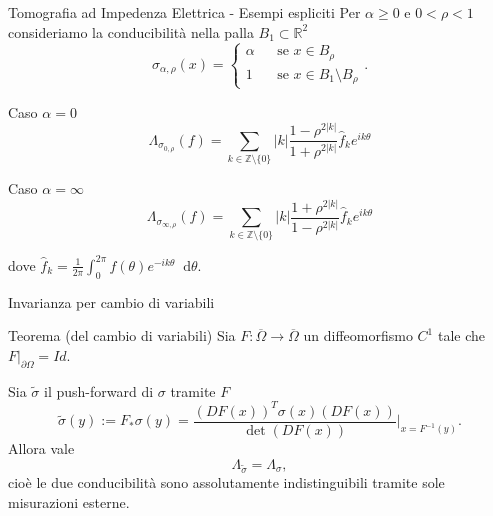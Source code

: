 \documentclass{beamer}
\newcommand{\bbR}{\mathbb{R}}
\newcommand{\de}{\partial}
\newcommand*\diff{\mathop{}\!\mathrm{d}}
\newcommand{\1}{\mathbbm{1}}
\begin{document}
\begin{frame}{Tomografia ad Impedenza Elettrica - Esempi espliciti}
Per $\alpha\geq0$ e $0<\rho<1$ consideriamo la conducibilità nella palla $B_1\subset\bbR^2$
\begin{equation*}
\sigma_{\alpha,\rho}(x) = 
	\left\{\begin{array}{lll}
         \alpha & & \text{se } x\in B_\rho \\
         1 & & \text{se } x\in B_1 \setminus B_\rho
    \end{array}\right..
\end{equation*}
\vspace{-15pt}
\pause
\begin{block}{Caso $\alpha=0$}
\[
\Lambda_{\sigma_{0,\rho}}(f) = 
\sum_{k\in\mathbb{Z}\setminus\{0\}} |k|\frac{1-\rho^{2|k|}}{1+\rho^{2|k|}} \hat{f}_k e^{ik\theta} 
\]
\end{block}
\pause
\begin{block}{Caso $\alpha=\infty$}
\[
\Lambda_{\sigma_{\infty,\rho}}(f) = 
\sum_{k\in\mathbb{Z}\setminus\{0\}} |k|\frac{1+\rho^{2|k|}}{1-\rho^{2|k|}} \hat{f}_k e^{ik\theta}
\]
\end{block}
\pause
dove $\hat{f}_k = \frac{1}{2\pi} \int_0^{2\pi} f(\theta)e^{-ik\theta} \diff\theta.$
\end{frame}


\begin{frame}{Invarianza per cambio di variabili}
\pause
\begin{block}{Teorema (del cambio di variabili)}
Sia $F:\overline{\Omega}\rightarrow\overline{\Omega}$ un diffeomorfismo $C^1$ tale che $F|_{\de\Omega}=Id$.\pause

Sia $\tilde{\sigma}$ il push-forward di $\sigma$ tramite $F$
\[ \tilde{\sigma}(y):=F_*\sigma(y)=\frac{(DF(x))^T\sigma(x)(DF(x))}{\det(DF(x))}\Bigg|_{x=F^{-1}(y)}.
\]\pause
Allora vale
\[ \Lambda_{\tilde{\sigma}} = \Lambda_\sigma ,\]
cioè le due conducibilità sono assolutamente indistinguibili tramite sole misurazioni esterne.
\end{block}
\end{frame}
\end{document}
